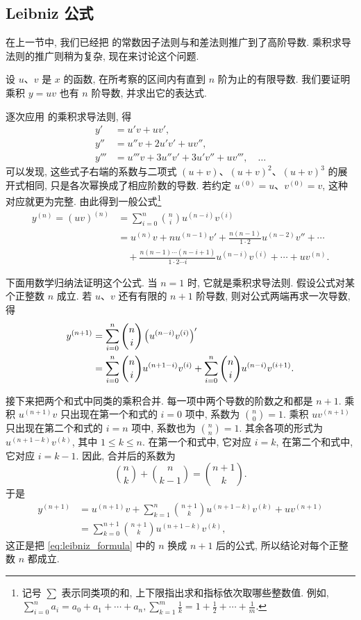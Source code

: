 \subsection{Leibniz 公式}\label{subsec:117}
在上一节中, 我们已经把  的常数因子法则与和差法则推广到了高阶导数.
乘积求导法则的推广则稍为复杂, 现在来讨论这个问题.

设 $u$、$v$ 是 $x$ 的函数, 在所考察的区间内有直到 $n$ 阶为止的有限导数.
我们要证明乘积 $y=uv$ 也有 $n$ 阶导数, 并求出它的表达式.

逐次应用  的乘积求导法则, 得
$$
\begin{aligned}
y'&=u'v+uv',\\
y''&=u''v+2u'v'+uv'',\\
y'''&=u'''v+3u''v'+3u'v''+uv''',\quad\ldots
\end{aligned}
$$
可以发现, 这些式子右端的系数与二项式 $(u+v)$、$(u+v)^2$、$(u+v)^3$ 的展开式相同,
只是各次幂换成了相应阶数的导数.
若约定 $u^{(0)}=u$、$v^{(0)}=v$, 这种对应就更为完整.
由此得到一般公式\footnote{记号 $\sum$ 表示同类项的和,
上下限指出求和指标依次取哪些整数值.
例如,
$
    \displaystyle\sum_{i=0}^{n}a_i=a_0+a_1+\cdots+a_n,
\sum_{k=1}^{m}\frac1k=1+\frac12+\cdots+\frac1m.
$}
\begin{equation}\label{eq:leibniz_formula}
\begin{aligned}
y^{(n)}=(uv)^{(n)}
&=\sum_{i=0}^{n}\binom ni u^{(n-i)}v^{(i)}\\
&=u^{(n)}v+nu^{(n-1)}v'
 +\frac{n(n-1)}{1\cdot2}u^{(n-2)}v''+\cdots\\
&\quad+\frac{n(n-1)\cdots(n-i+1)}{1\cdot2\cdots i}
 u^{(n-i)}v^{(i)}+\cdots+uv^{(n)}.
\end{aligned}
\end{equation}

下面用数学归纳法证明这个公式.
当 $n=1$ 时, 它就是乘积求导法则.
假设公式对某个正整数 $n$ 成立.
若 $u$、$v$ 还有有限的 $n+1$ 阶导数, 则对公式两端再求一次导数, 得
$$
\begin{aligned}
y^{(n+1)}
&=\sum_{i=0}^{n}\binom ni\left( u^{(n-i)}v^{(i)} \right)'\\
&=\sum_{i=0}^{n}\binom ni u^{(n+1-i)}v^{(i)}
 +\sum_{i=0}^{n}\binom ni u^{(n-i)}v^{(i+1)}.
\end{aligned}
$$

接下来把两个和式中同类的乘积合并.
每一项中两个导数的阶数之和都是 $n+1$.
乘积 $u^{(n+1)}v$ 只出现在第一个和式的 $i=0$ 项中,
系数为 $\displaystyle\binom n0=1$.
乘积 $uv^{(n+1)}$ 只出现在第二个和式的 $i=n$ 项中,
系数也为 $\displaystyle\binom nn=1$.
其余各项的形式为 $u^{(n+1-k)}v^{(k)}$, 其中 $1\leq k\leq n$.
在第一个和式中, 它对应 $i=k$,
在第二个和式中, 它对应 $i=k-1$.
因此, 合并后的系数为
$$
\binom nk+\binom n{k-1}=\binom{n+1}k.
$$
于是
$$
\begin{aligned}
y^{(n+1)}
&=u^{(n+1)}v
 +\sum_{k=1}^{n}\binom{n+1}k u^{(n+1-k)}v^{(k)}
 +uv^{(n+1)}\\
&=\sum_{k=0}^{n+1}\binom{n+1}k u^{(n+1-k)}v^{(k)},
\end{aligned}
$$
这正是把 \eqref{eq:leibniz_formula} 中的 $n$ 换成 $n+1$ 后的公式,
所以结论对每个正整数 $n$ 都成立.

